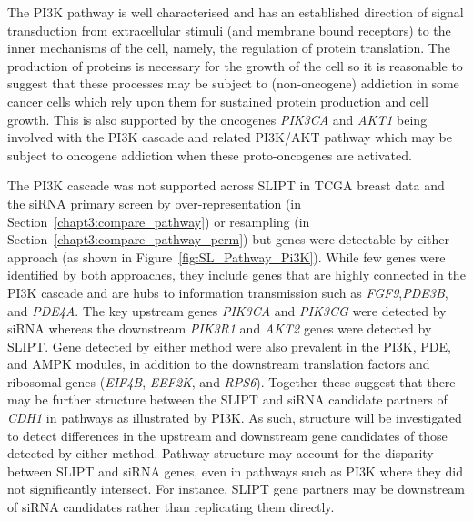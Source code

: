 The \gls{PI3K} \gls{pathway} is well characterised and has an established direction of signal transduction from extracellular stimuli (and membrane bound receptors) to the inner mechanisms of the cell, namely, the regulation of protein translation. The production of proteins is necessary for the growth of the cell so it is reasonable to suggest that these processes may be subject to (non-\gls{oncogene}) addiction in some cancer cells which rely upon them for sustained protein production and cell growth. This is also supported by the \glspl{oncogene} \textit{PIK3CA} and \textit{AKT1} being involved with the PI3K cascade and related PI3K/AKT \gls{pathway} which may be subject to \gls{oncogene addiction} when these proto-oncogenes are activated.

\begin{figure*}[!tb]
  \begin{center}
   }
   \end{center}
   \caption[Synthetic lethality in the PI3K cascade]{\small \textbf{Synthetic lethality in the PI3K cascade.} The Reactome \gls{PI3K} Cascade \gls{pathway} with \gls{synthetic lethal} candidates coloured as shown in the legend.
}
\label{fig:SL_Pathway_Pi3K}
\end{figure*}

The \gls{PI3K} cascade was not supported across \gls{SLIPT} in \gls{TCGA} breast  data and the \gls{siRNA} primary screen by over-representation (in Section~\ref{chapt3:compare_pathway}) or resampling (in Section~\ref{chapt3:compare_pathway_perm}) but genes were detectable by either approach (as shown in Figure~\ref{fig:SL_Pathway_Pi3K}).  While few genes were identified by both approaches, they include genes that are highly connected in the PI3K cascade and are hubs to information transmission such as \textit{FGF9},\textit{PDE3B}, and \textit{PDE4A}. The key upstream genes \textit{PIK3CA} and \textit{PIK3CG} were detected by \gls{siRNA} whereas the downstream \textit{PIK3R1} and \textit{AKT2} genes were detected by \gls{SLIPT}. Gene detected by either method were also prevalent in the \gls{PI3K}, \gls{PDE}, and \gls{AMPK} modules, in addition to the downstream translation factors and ribosomal genes (\textit{EIF4B}, \textit{EEF2K}, and \textit{RPS6}). Together these suggest that there may be further structure between the \gls{SLIPT} and \gls{siRNA} candidate partners of \textit{CDH1} in \glspl{pathway} as illustrated by \gls{PI3K}. As such,  structure will be investigated to detect differences in the upstream and downstream gene candidates of those detected by either method. Pathway structure may account for the disparity between \gls{SLIPT} and \gls{siRNA} genes, even in \glspl{pathway} such as PI3K where they did not significantly intersect. For instance, \gls{SLIPT} gene partners may be downstream of \gls{siRNA} candidates rather than replicating them directly.


